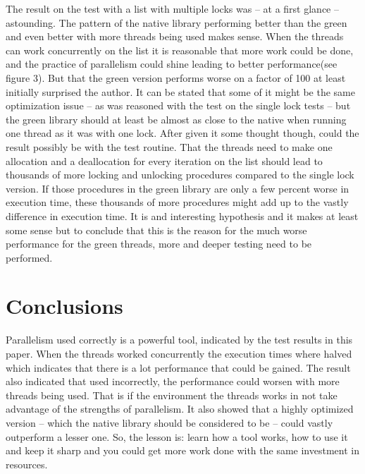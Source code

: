 \documentclass{article}
\begin{document}
The result on the test with a list with multiple locks was – at a first glance – astounding. The pattern of the native library performing better than the green and even better with more threads being used makes sense. When the threads can work concurrently on the list it is reasonable that more work could be done, and the practice of parallelism could shine leading to better performance(see figure 3). But that the green version performs worse on a factor of 100 at least initially surprised the author. It can be stated that some of it might be the same optimization issue – as was reasoned with the test on the single lock tests – but the green library should at least be almost as close to the native when running one thread as it was with one lock. After given it some thought though, could the result possibly be with the test routine. That the threads need to make one allocation and a deallocation for every iteration on the list should lead to thousands of more locking and unlocking procedures compared to the single lock version. If those procedures in the green library are only a few percent worse in execution time, these thousands of more procedures might add up to the vastly difference in execution time. It is and interesting hypothesis and it makes at least some sense but to conclude that this is the reason for the much worse performance for the green threads, more and deeper testing need to be performed.

\section{Conclusions}\label{conclusions}

Parallelism used correctly is a powerful tool, indicated by the test results in this paper. When the threads worked concurrently the execution times where halved which indicates that there is a lot performance that could be gained. The result also indicated that used incorrectly, the performance could worsen with more threads being used. That is if the environment the threads works in not take advantage of the strengths of parallelism.  It also showed that a highly optimized version – which the native library should be considered to be – could vastly outperform a lesser one. So, the lesson is: learn how a tool works, how to use it and keep it sharp and you could get more work done with the same investment in resources.
\end{document}
